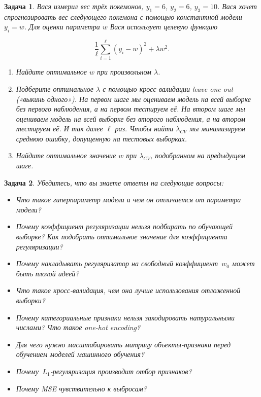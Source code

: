 \documentclass[12pt,fleqn]{article}
\newtheorem{esProblem}{Задача}
\begin{document}
\begin{esProblem}
Вася измерил вес трёх покемонов,  $y_1=6$, $y_2=6$, $y_3=10$.  Вася хочет спрогнозировать вес следующего покемона с помощью константной модели $y_i = w$. Для оценки параметра $w$ Вася использует целевую функцию

\begin{equation*} 
    \frac{1}{\ell}\sum_{i=1}^{\ell} (y_i - w)^2 + \lambda w^2.
\end{equation*} 

\begin{enumerate}
    \item Найдите оптимальное $w$ при произвольном $\lambda$. 
    \item Подберите оптимальное $\lambda$ с помощью кросс-валидации leave one out («выкинь одного»). На первом шаге мы оцениваем модель на всей выборке без первого наблюдения, а на первом тестируем её. На втором шаге мы оцениваем модель на всей выборке без второго наблюдения, а на втором тестируем её. И так далее $\ell$ раз. Чтобы найти $\lambda_{CV}$ мы минимизируем среднюю ошибку, допущенную на тестовых выборках.
	\item Найдите оптимальное значение $w$ при $\lambda_{CV}$, подобранном на предыдущем шаге. 
\end{enumerate}
\end{esProblem}

\begin{esProblem}
    Убедитесь, что вы знаете ответы на следующие вопросы:
    \begin{itemize}
        \item Что такое гиперпараметр модели и чем он отличается от параметра модели?
        \item Почему коэффициент регуляризации нельзя подбирать по обучающей выборке? Как подобрать оптимальное значение для коэффициента регуляризации? 
        \item Почему накладывать регуляризатор на свободный коэффициент~$w_0$ может быть плохой идеей?
        \item Что такое кросс-валидация, чем она лучше использования отложенной выборки?
        \item Почему категориальные признаки нельзя закодировать натуральными числами? Что такое one-hot encoding?
        \item Для чего нужно масштабировать матрицу объекты-признаки перед обучением моделей машинного обучения?
        \item Почему~$L_1$-регуляризация производит отбор признаков?
        \item Почему MSE чувствительно к выбросам? 
    \end{itemize}
\end{esProblem}
\end{document}
